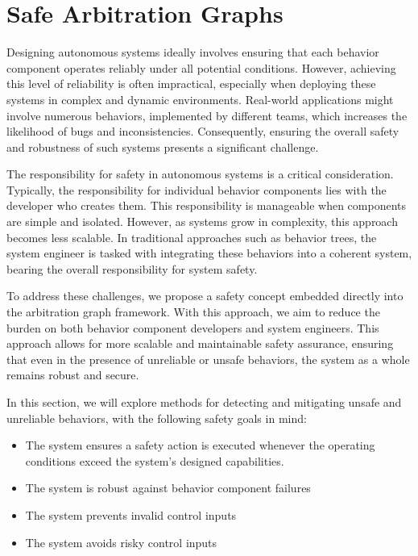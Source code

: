 \section{Safe Arbitration Graphs}

Designing autonomous systems ideally involves ensuring that each behavior component operates reliably under all potential conditions.
However, achieving this level of reliability is often impractical, especially when deploying these systems in complex and dynamic environments.
Real-world applications might involve numerous behaviors, implemented by different teams, which increases the likelihood of bugs and inconsistencies.
Consequently, ensuring the overall safety and robustness of such systems presents a significant challenge.

The responsibility for safety in autonomous systems is a critical consideration.
Typically, the responsibility for individual behavior components lies with the developer who creates them.
This responsibility is manageable when components are simple and isolated. However, as systems grow in complexity, this approach becomes less scalable.
In traditional approaches such as behavior trees, the system engineer is tasked with integrating these behaviors into a coherent system, bearing the overall responsibility for system safety.

To address these challenges, we propose a safety concept embedded directly into the arbitration graph framework.
With this approach, we aim to reduce the burden on both behavior component developers and system engineers.
This approach allows for more scalable and maintainable safety assurance, ensuring that even in the presence of unreliable or unsafe behaviors, the system as a whole remains robust and secure.

In this section, we will explore methods for detecting and mitigating unsafe and unreliable behaviors, with the following safety goals in mind:

\begin{itemize}
    \item The system ensures a safety action is executed whenever the operating conditions exceed the system's designed capabilities.
    \item The system is robust against behavior component failures
    \item The system prevents invalid control inputs
    \item The system avoids risky control inputs
\end{itemize}

